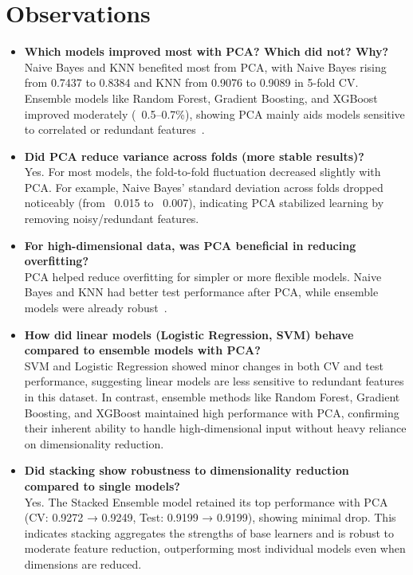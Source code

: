\documentclass[11pt]{article}
\begin{document}
\vspace{0.8cm}
\section{Observations}
\begin{itemize}
    \item \textbf{Which models improved most with PCA? Which did not? Why?} \\
Naive Bayes and KNN benefited most from PCA, with Naive Bayes rising from 0.7437 to 0.8384 and KNN from 0.9076 to 0.9089 in 5-fold CV. Ensemble models like Random Forest, Gradient Boosting, and XGBoost improved moderately (~0.5–0.7\%), showing PCA mainly aids models sensitive to correlated or redundant features~\cite{lubis2020accuracy}.


    \item \textbf{Did PCA reduce variance across folds (more stable results)?} \\
    Yes. For most models, the fold-to-fold fluctuation decreased slightly with PCA. For example, Naive Bayes' standard deviation across folds dropped noticeably (from ~0.015 to ~0.007), indicating PCA stabilized learning by removing noisy/redundant features. 

    \item \textbf{For high-dimensional data, was PCA beneficial in reducing overfitting?} \\
PCA helped reduce overfitting for simpler or more flexible models. Naive Bayes and KNN had better test performance after PCA, while ensemble models were already robust~\cite{salam2021effect}.

    \item \textbf{How did linear models (Logistic Regression, SVM) behave compared to ensemble models with PCA?} \\
    SVM and Logistic Regression showed minor changes in both CV and test performance, suggesting linear models are less sensitive to redundant features in this dataset. In contrast, ensemble methods like Random Forest, Gradient Boosting, and XGBoost maintained high performance with PCA, confirming their inherent ability to handle high-dimensional input without heavy reliance on dimensionality reduction.  

    \item \textbf{Did stacking show robustness to dimensionality reduction compared to single models?} \\
    Yes. The Stacked Ensemble model retained its top performance with PCA (CV: 0.9272 → 0.9249, Test: 0.9199 → 0.9199), showing minimal drop. This indicates stacking aggregates the strengths of base learners and is robust to moderate feature reduction, outperforming most individual models even when dimensions are reduced.  
\end{itemize}
\end{document}
